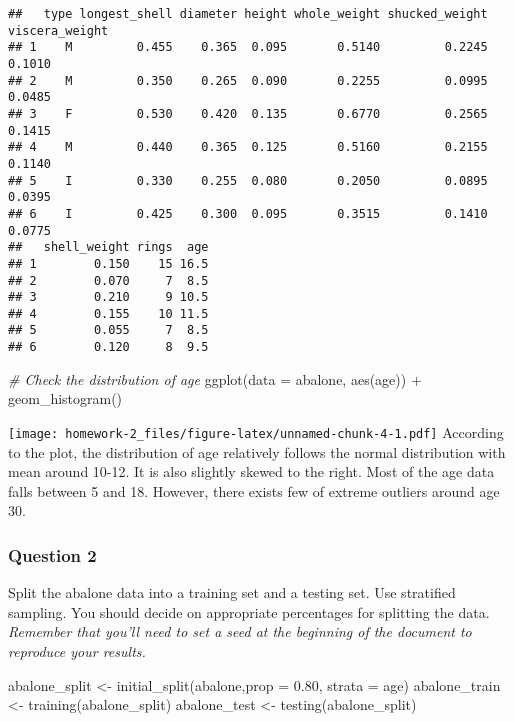 \documentclass[
]{article}
\newenvironment{Shaded}{\begin{snugshade}}{\end{snugshade}}
\newcommand{\AttributeTok}[1]{\textcolor[rgb]{0.77,0.63,0.00}{#1}}
\newcommand{\CommentTok}[1]{\textcolor[rgb]{0.56,0.35,0.01}{\textit{#1}}}
\newcommand{\FloatTok}[1]{\textcolor[rgb]{0.00,0.00,0.81}{#1}}
\newcommand{\FunctionTok}[1]{\textcolor[rgb]{0.00,0.00,0.00}{#1}}
\newcommand{\NormalTok}[1]{#1}
\newcommand{\OtherTok}[1]{\textcolor[rgb]{0.56,0.35,0.01}{#1}}
\newcommand{\SpecialCharTok}[1]{\textcolor[rgb]{0.00,0.00,0.00}{#1}}
\begin{document}
\begin{verbatim}
##   type longest_shell diameter height whole_weight shucked_weight viscera_weight
## 1    M         0.455    0.365  0.095       0.5140         0.2245         0.1010
## 2    M         0.350    0.265  0.090       0.2255         0.0995         0.0485
## 3    F         0.530    0.420  0.135       0.6770         0.2565         0.1415
## 4    M         0.440    0.365  0.125       0.5160         0.2155         0.1140
## 5    I         0.330    0.255  0.080       0.2050         0.0895         0.0395
## 6    I         0.425    0.300  0.095       0.3515         0.1410         0.0775
##   shell_weight rings  age
## 1        0.150    15 16.5
## 2        0.070     7  8.5
## 3        0.210     9 10.5
## 4        0.155    10 11.5
## 5        0.055     7  8.5
## 6        0.120     8  9.5
\end{verbatim}

\begin{Shaded}
\begin{Highlighting}[]
\CommentTok{\# Check the distribution of \textasciigrave{}age\textasciigrave{}}
\FunctionTok{ggplot}\NormalTok{(}\AttributeTok{data =}\NormalTok{ abalone, }\FunctionTok{aes}\NormalTok{(age)) }\SpecialCharTok{+}
  \FunctionTok{geom\_histogram}\NormalTok{()}
\end{Highlighting}
\end{Shaded}

\texttt{[image: homework-2\_files/figure-latex/unnamed-chunk-4-1.pdf]}
According to the plot, the distribution of age relatively follows the
normal distribution with mean around 10-12. It is also slightly skewed
to the right. Most of the age data falls between 5 and 18. However,
there exists few of extreme outliers around age 30.

\hypertarget{question-2}{%
\subsubsection{Question 2}\label{question-2}}

Split the abalone data into a training set and a testing set. Use
stratified sampling. You should decide on appropriate percentages for
splitting the data. \emph{Remember that you'll need to set a seed at the
beginning of the document to reproduce your results.}

\begin{Shaded}
\begin{Highlighting}[]
\NormalTok{abalone\_split }\OtherTok{\textless{}{-}} \FunctionTok{initial\_split}\NormalTok{(abalone,}\AttributeTok{prop =} \FloatTok{0.80}\NormalTok{, }\AttributeTok{strata =}\NormalTok{ age)}
\NormalTok{abalone\_train }\OtherTok{\textless{}{-}} \FunctionTok{training}\NormalTok{(abalone\_split)}
\NormalTok{abalone\_test }\OtherTok{\textless{}{-}} \FunctionTok{testing}\NormalTok{(abalone\_split)}
\end{Highlighting}
\end{Shaded}
\end{document}
